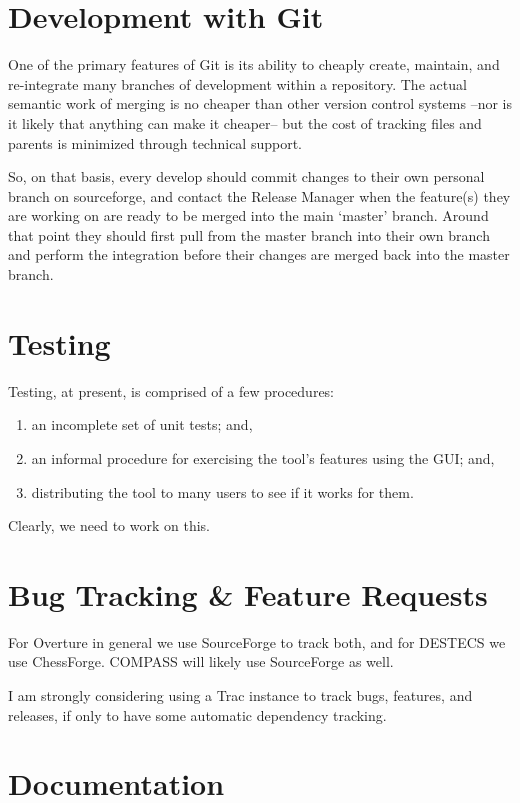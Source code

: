 \documentclass{overturerep}
\newenvironment{denseenumerate}
  {\begin{enumerate}\setlength{\itemsep}{0pt}\setlength{\parskip}{0pt}\setlength{\parsep}{0pt}}
  {\end{enumerate}}
\begin{document}
\section{Development with Git}
  One of the primary features of Git is its ability to cheaply create,
  maintain, and re-integrate many branches of development within a
  repository.  The actual semantic work of merging is no cheaper than
  other version control systems --nor is it likely that anything can
  make it cheaper-- but the cost of tracking files and parents is
  minimized through technical support.

  So, on that basis, every develop should commit changes to their own
  personal branch on sourceforge, and contact the Release Manager when
  the feature(s) they are working on are ready to be merged into the
  main `master' branch.  Around that point they should first pull from
  the master branch into their own branch and perform the integration
  before their changes are merged back into the master branch.


\section{Testing}

  Testing, at present, is comprised of a few procedures:

\begin{denseenumerate}
\item an incomplete set of unit tests; and,
\item an informal procedure for exercising the tool's features using the GUI; and,
\item distributing the tool to many users to see if it works for them.
\end{denseenumerate}

  Clearly, we need to work on this.

\section{Bug Tracking \& Feature Requests}

  For Overture in general we use SourceForge to track both, and for
  DESTECS we use ChessForge.  COMPASS will likely use SourceForge as
  well.

  I am strongly considering using a Trac instance to track bugs,
  features, and releases, if only to have some automatic dependency
  tracking.

\section{Documentation}
\end{document}
